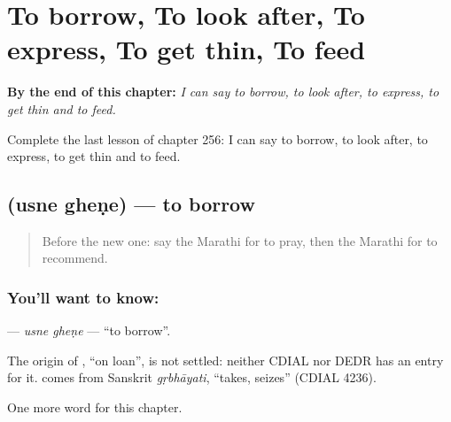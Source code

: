
\chapter{To borrow, To look after, To express, To get thin, To feed}
\label{ch:mr-to-borrow-to-look-after-to-express-to-get-thin-to-feed}

\begin{chapteropening}
\textbf{By the end of this chapter:} \emph{I can say to borrow, to look after, to express, to get thin and to feed.}

Complete the last lesson of chapter 256: I can say to borrow, to look after, to express, to get thin and to feed.
\end{chapteropening}

\section[\texorpdfstring{\mr{उसने} \mr{घेणे} (usne gheṇe)}{उसने घेणे (usne gheṇe)}]{  (usne gheṇe) — to borrow}

\label{lesson:MR-C256-usne-ghene}



\begin{quote}
Before the new one: say the Marathi for to pray, then the Marathi for to recommend.
\end{quote}

\subsection*{You'll want to know:  }
\textbf{ } — \emph{usne gheṇe} — \textquotedblleft{}to borrow\textquotedblright{}.

\begin{cousinweb}
The origin of \textbf{}, \textquotedblleft{}on loan\textquotedblright{}, is not settled: neither CDIAL nor DEDR has an entry for it. \textbf{} comes from Sanskrit \emph{gṛbhāyati}, \textquotedblleft{}takes, seizes\textquotedblright{} (CDIAL 4236).
\end{cousinweb}

\begin{grammarlens}[title={What you've built}]
One more word for this chapter.
\end{grammarlens}

